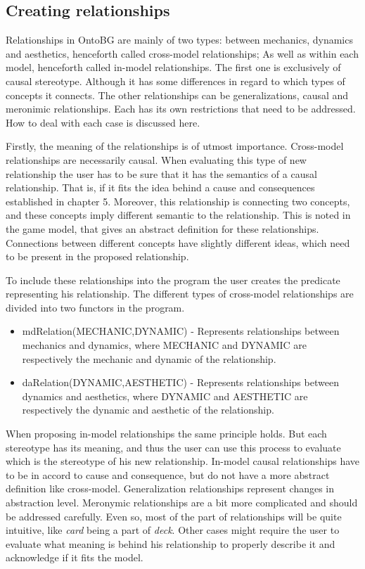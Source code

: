 \subsection{Creating relationships}

Relationships in OntoBG are mainly of two types: between mechanics, dynamics and aesthetics, henceforth called cross-model relationships; As well as within each model, henceforth called in-model relationships. The first one is exclusively of causal stereotype. Although it has some differences in regard to which types of concepts it connects. The other relationships can be generalizations, causal and meronimic relationships. Each has its own restrictions that need to be addressed. How to deal with each case is discussed here.

Firstly, the meaning of the relationships is of utmost importance. Cross-model relationships are necessarily causal. When evaluating this type of new relationship the user has to be sure that it has the semantics of a causal relationship. That is, if it fits the idea behind a cause and consequences established in chapter 5. Moreover, this relationship is connecting two concepts, and these concepts imply different semantic to the relationship. This is noted in the game model, that gives an abstract definition for these relationships. Connections between different concepts have slightly different ideas, which need to be present in the proposed relationship.

To include these relationships into the program the user creates the predicate representing his relationship. The different types of cross-model relationships are divided into two functors in the program.
\begin{itemize}
    \item mdRelation(MECHANIC,DYNAMIC) - Represents relationships between mechanics and dynamics, where MECHANIC and DYNAMIC are respectively the mechanic and dynamic of the relationship.
    \item daRelation(DYNAMIC,AESTHETIC) - Represents relationships between dynamics and aesthetics, where DYNAMIC and AESTHETIC are respectively the dynamic and aesthetic of the relationship.
\end{itemize}

When proposing in-model relationships the same principle holds. But each stereotype has its meaning, and thus the user can use this process to evaluate which is the stereotype of his new relationship. In-model causal relationships have to be in accord to cause and consequence, but do not have a more abstract definition like cross-model. Generalization relationships represent changes in abstraction level. Meronymic relationships are a bit more complicated and should be addressed carefully. Even so, most of the part of relationships will be quite intuitive, like \textit{card} being a part of \textit{deck}. Other cases might require the user to evaluate what meaning is behind his relationship to properly describe it and acknowledge if it fits the model.

